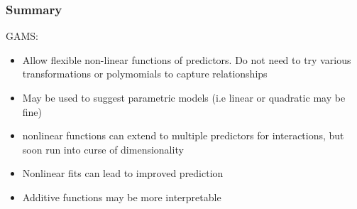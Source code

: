 \documentclass[]{beamer}\usepackage[]{graphicx}\usepackage[]{color}
\begin{document}
\begin{frame}\frametitle{Summary}
GAMS:

\begin{itemize}
\item Allow flexible non-linear functions of predictors.  Do not need to try various transformations or polymomials to capture relationships \pause

\item May be used to suggest parametric models (i.e linear or quadratic may be fine) \pause

\item nonlinear functions can extend to multiple predictors for interactions, but soon run into curse of dimensionality \pause

\item Nonlinear fits can lead to improved prediction \pause

\item Additive functions may be more interpretable
\end{itemize}
\end{frame}
\end{document}
